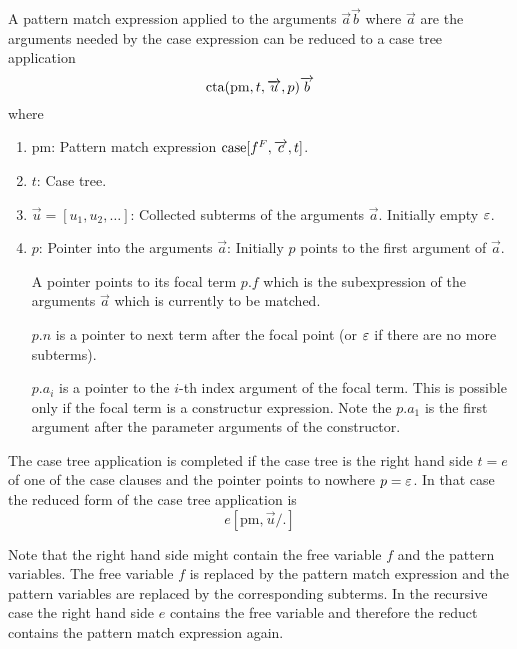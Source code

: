 A pattern match expression applied to the arguments $\vec a \vec b$ where $\vec
a$ are the arguments needed by the case expression can be reduced to a case tree
application
$$
    {\text{cta}}(\text{pm}, t, {\overrightarrow {u}}, p) {\overrightarrow {b}}
$$
where
\begin{enumerate}
    \item $\text{pm}$: Pattern match expression ${\text{case}}[f^F, {\overrightarrow {c}}, t]$.

    \item $t$: Case tree.

    \item $\vec u = [u_1, u_2, \ldots]$: Collected subterms of the arguments
        $\vec a$. Initially empty $\varepsilon$.

    \item $p$: Pointer into the arguments $\vec a$: Initially $p$ points to the
        first argument of $\vec a$.

        A pointer points to its
        focal term $p.f$ which is the subexpression of the arguments $\vec a$
        which is currently to be matched.

        $p.n$ is a pointer to next term after the
        focal point (or $\varepsilon$ if there are no more subterms).

        $p.a_i$ is a pointer to the $i$-th index argument of the focal term.
        This is possible only if the focal term is a constructur expression.
        Note the $p.a_1$ is the first argument after the parameter arguments of
        the constructor.
\end{enumerate}

The case tree application is completed if the case tree is the right hand side
$t = e$ of one of the case clauses and the pointer points to nowhere $p =
\varepsilon$. In that case the reduced form of the case tree application is
$$
    e[\text{pm}, \vec u/ .]
$$

Note that the right hand side might contain the free
variable $f$ and the pattern variables. The free variable $f$ is replaced by the
pattern match expression and the pattern variables are replaced by the
corresponding subterms. In the recursive case the right hand side $e$ contains
the free variable and therefore the reduct contains the pattern match expression
again.

